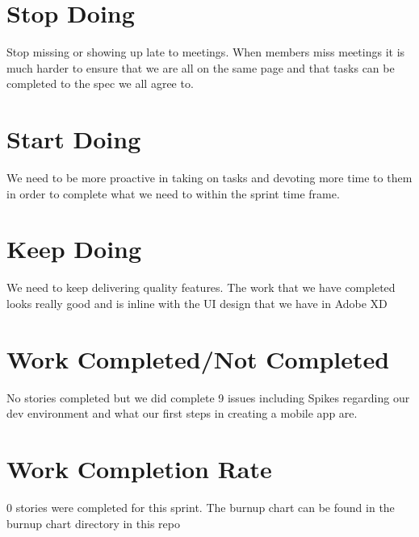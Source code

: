 \documentclass[12pt,letterpaper]{article}
\begin{document}
	\section*{Stop Doing}
		Stop missing or showing up late to meetings. When members miss meetings it is much harder to ensure that we are all on the same page and that tasks can be completed to the spec we all agree to.
	\section*{Start Doing}
		We need to be more proactive in taking on tasks and devoting more time to them in order to complete what we need to within the sprint time frame.
	\section*{Keep Doing}
		We need to keep delivering quality features. The work that we have completed looks really good and is inline with the UI design that we have in Adobe XD
	\section*{Work Completed/Not Completed}
		No stories completed but we did complete 9 issues including Spikes regarding our dev environment and what our first steps in creating a mobile app are.
	\section*{Work Completion Rate}
		0 stories were completed for this sprint. The burnup chart can be found in the burnup chart directory in this repo
\end{document}
